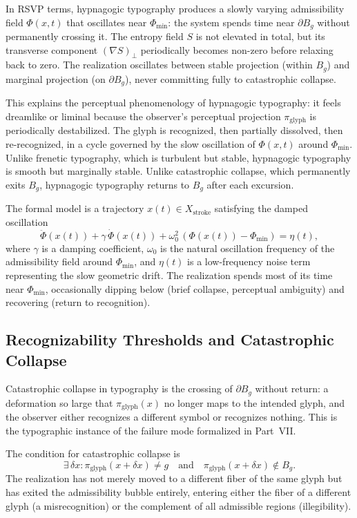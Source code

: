 \documentclass[12pt, a4paper]{article}
\theoremstyle{essaystyle}
\begin{document}
In RSVP terms, hypnagogic typography produces a slowly varying admissibility field
$\Phi(x, t)$ that oscillates near $\Phi_{\min}$: the system spends time near $\partial B_g$
without permanently crossing it. The entropy field $S$ is not elevated in total, but
its transverse component $(\nabla S)_\perp$ periodically becomes non-zero before
relaxing back to zero. The realization oscillates between stable projection (within
$B_g$) and marginal projection (on $\partial B_g$), never committing fully to
catastrophic collapse.

This explains the perceptual phenomenology of hypnagogic typography: it feels dreamlike
or liminal because the observer's perceptual projection $\pi_{\mathrm{glyph}}$ is
periodically destabilized. The glyph is recognized, then partially dissolved, then
re-recognized, in a cycle governed by the slow oscillation of $\Phi(x,t)$ around
$\Phi_{\min}$. Unlike frenetic typography, which is turbulent but stable, hypnagogic
typography is smooth but marginally stable. Unlike catastrophic collapse, which
permanently exits $B_g$, hypnagogic typography returns to $B_g$ after each excursion.

The formal model is a trajectory $x(t) \in X_{\mathrm{stroke}}$ satisfying the
damped oscillation
\[
\ddot{\Phi}(x(t)) + \gamma\,\dot{\Phi}(x(t)) + \omega_0^2\,(\Phi(x(t)) - \Phi_{\min}) = \eta(t),
\]
where $\gamma$ is a damping coefficient, $\omega_0$ is the natural oscillation frequency
of the admissibility field around $\Phi_{\min}$, and $\eta(t)$ is a low-frequency
noise term representing the slow geometric drift. The realization spends most of its
time near $\Phi_{\min}$, occasionally dipping below (brief collapse, perceptual
ambiguity) and recovering (return to recognition).

\subsection{Recognizability Thresholds and Catastrophic Collapse}

Catastrophic collapse in typography is the crossing of $\partial B_g$ without return:
a deformation so large that $\pi_{\mathrm{glyph}}(x)$ no longer maps to the intended
glyph, and the observer either recognizes a different symbol or recognizes nothing.
This is the typographic instance of the failure mode formalized in Part~VII.

The condition for catastrophic collapse is
\[
\exists\, \delta x : \pi_{\mathrm{glyph}}(x + \delta x) \neq g
\quad \text{and} \quad
\pi_{\mathrm{glyph}}(x + \delta x) \notin B_g.
\]
The realization has not merely moved to a different fiber of the same glyph but has
exited the admissibility bubble entirely, entering either the fiber of a different
glyph (a misrecognition) or the complement of all admissible regions (illegibility).
\end{document}
